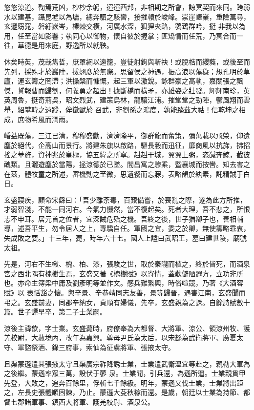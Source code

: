 \begin{pinyinscope}
 悠悠涼道。鞠焉荒凶，杪杪余躬，迢迢西邦，非相期之所會，諒冥契而來同。跨弱水以建基，躡昆墟以為墉，總奔駟之駭轡，接摧轅於峻峰。崇崖崨嶪，重險萬尋，玄邃窈窕，磐紆嶔岑，榛棘交橫，河廣水深，狐狸夾路，鴞鵄群吟，挺
 非我以為用，任至當如影響；執同心以御物，懷自彼於握掌；匪矯情而任荒，乃冥合而一往，華德是用來庭，野逸所以就鞅。



 休矣時英，茂哉雋哲，庶罩網以遠籠，豈徒射鉤與斬袂！或脫梏而纓蕤，或後至而先列，採殊才於巖陸，拔翹彥於無際。思留侯之神遇，振高浪以蕩穢；想孔明於草廬，運玄籌之罔滯；洪操槃而慷慨，起三軍以激銳。詠群豪之高軌，嘉關張之飄傑，誓報曹而歸劉，何義勇之超出！據斷橋而橫矛，亦雄姿之壯發。輝輝南珍，英英周魯，挺奇荊吳，昭文烈武，建策烏林，龍驤江浦。摧堂堂之勁陣，鬱風翔而雲舉，紹攀韓之遠蹤，侔徽猷於
 召武，非劉孫之鴻度，孰能臻茲大祜！信乾坤之相成，庶物希風而潤雨。



 崏益既蕩，三江已清，穆穆盛勳，濟濟隆平，御群龍而奮策，彌萬載以飛榮，仰遺塵於絕代，企高山而景行。將建朱旗以啟路，驅長轂而迅征，靡商風以抗旆，拂招搖之華旌，資神兆於皇極，協五緯之所寧。赳赳干城，翼翼上粥，恣馘奔鯨，截彼醜類。且灑遊塵於當陽，拯涼德於已墜。間昌寓之驂乘，暨襄城而按轡。知去害之在茲，體牧童之所述，審機動之至微，思遺餐而忘寐，表略韻於紈素，託精誠于白日。



 玄盛寢疾，顧命宋繇曰：「吾少離荼毒，百艱備嘗，於喪亂之際，遂為此方所推，
 才弱智淺，不能一同河右。今氣力惙然，當不復起矣。死者大理，吾不悲之，所恨志不申耳。居元首之位者，宜深誡危殆之機。吾終之後，世子猶卿子也，善相輔導，述吾平生，勿令居人之上，專驕自任。軍國之宜，委之於卿，無使籌略乖衷，失成敗之要。」十三年，薨，時年六十七。國人上謚曰武昭王，墓曰建世陵，廟號太祖。



 先是，河右不生楸、槐、柏、漆，張駿之世，取於秦隴而植之，終於皆死，而酒泉宮之西北隅有槐樹生焉，玄盛又著《槐樹賦》以寄情，蓋歎僻陋遐方，立功非所也。亦命主簿梁中庸及劉彥明等並作文。感兵難繁興，時俗喧競，乃著《大酒容賦》以
 表恬豁之懷。與辛景、辛恭靖同志友善，景等歸晉，遇害江南，玄盛聞而弔之。玄盛前妻，同郡辛納女，貞順有婦儀，先卒，玄盛親為之誄。自餘詩賦數十篇。世子譚早卒，第二子士業嗣。



 涼後主諱歆，字士業。玄盛薨時，府僚奉為大都督、大將軍、涼公、領涼州牧、護羌校尉，大赦境內，改年為嘉興。尊母尹氏為太后，以宋繇為武衛將軍、廣夏太守、軍諮祭酒、錄三府事，索仙為征虜將軍、張掖太守。



 且渠蒙遜遣其張掖太守且渠廣宗祚降誘士業，士業遣武衛溫宜等赴之，親勒大軍為之後繼。蒙遜率眾三萬，設伏于蓼
 泉。士業聞，引兵還，為遜所逼。士業親貫甲先登，大敗之，追奔百餘里，俘斬七千餘級。明年，蒙遜又伐士業，士業將出距之，左長史張體順固諫，乃止。蒙遜大芟秋稼而還。是歲，朝廷以士業為持節、都督七郡諸軍事、鎮西大將軍、護羌校尉、酒泉公。




\end{pinyinscope}
